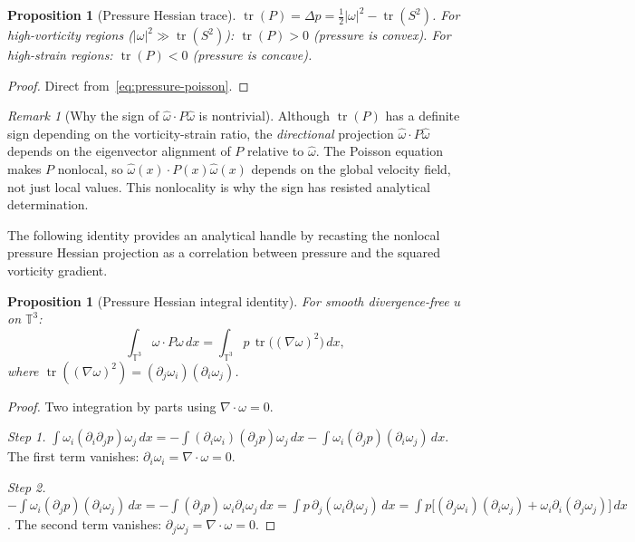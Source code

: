 \documentclass[11pt,a4paper]{article}
\theoremstyle{plain}
\newtheorem{proposition}[theorem]{Proposition}
\theoremstyle{definition}
\theoremstyle{remark}
\newtheorem{remark}[theorem]{Remark}
\newcommand{\T}{\mathbb{T}}
\DeclareMathOperator{\tr}{tr}
\begin{document}
\begin{proposition}[Pressure Hessian trace]
\label{prop:pressure-trace}
$\tr(P) = \Delta p = \frac{1}{2}|\omega|^2
- \tr(S^2)$.  For high-vorticity regions
($|\omega|^2\gg\tr(S^2)$): $\tr(P)>0$
(pressure is convex).  For high-strain regions:
$\tr(P)<0$ (pressure is concave).
\end{proposition}

\begin{proof}
Direct from~\eqref{eq:pressure-poisson}.
\end{proof}

\begin{remark}[Why the sign of $\hat\omega\cdot
P\hat\omega$ is nontrivial]
\label{rem:P-sign}
Although $\tr(P)$ has a definite sign depending on
the vorticity-strain ratio, the \emph{directional}
projection $\hat\omega\cdot P\hat\omega$ depends on
the eigenvector alignment of $P$ relative to
$\hat\omega$.  The Poisson equation makes $P$
nonlocal, so $\hat\omega(x)\cdot P(x)\hat\omega(x)$
depends on the global velocity field, not just
local values.  This nonlocality is why the sign
has resisted analytical determination.
\end{remark}

The following identity provides an analytical handle
by recasting the nonlocal pressure Hessian projection
as a correlation between pressure and the squared
vorticity gradient.

\begin{proposition}[Pressure Hessian integral identity]
\label{prop:P-identity}
For smooth divergence-free $u$ on $\T^3$:
\begin{equation}\label{eq:P-identity}
\int_{\T^3}\omega\cdot P\omega\,dx
= \int_{\T^3} p\,\tr\bigl((\nabla\omega)^2\bigr)\,dx,
\end{equation}
where $\tr((\nabla\omega)^2) = (\partial_j\omega_i)
(\partial_i\omega_j)$.
\end{proposition}

\begin{proof}
Two integration by parts using $\nabla\cdot\omega=0$.

\emph{Step 1.}
$\int\omega_i(\partial_i\partial_j p)\omega_j\,dx
= -\int(\partial_i\omega_i)(\partial_j p)\omega_j\,dx
- \int\omega_i(\partial_j p)(\partial_i\omega_j)\,dx$.
The first term vanishes: $\partial_i\omega_i
= \nabla\cdot\omega = 0$.

\emph{Step 2.}
$-\int\omega_i(\partial_j p)(\partial_i\omega_j)\,dx
= -\int(\partial_j p)\,\omega_i\partial_i\omega_j\,dx
= \int p\,\partial_j(\omega_i\partial_i\omega_j)\,dx
= \int p\bigl[(\partial_j\omega_i)(\partial_i\omega_j)
+ \omega_i\partial_i(\partial_j\omega_j)\bigr]\,dx$.
The second term vanishes:
$\partial_j\omega_j = \nabla\cdot\omega = 0$.
\end{proof}
\end{document}
